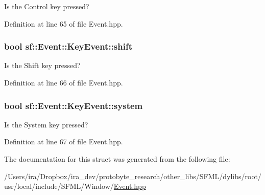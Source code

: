 Is the Control key pressed? 



Definition at line 65 of file Event.\-hpp.

\hypertarget{structsf_1_1_event_1_1_key_event_a776af1a3ca79abeeec18ebf1c0065aa9}{
\subsubsection[{shift}]{\setlength{\rightskip}{0pt plus 5cm}bool sf\-::\-Event\-::\-Key\-Event\-::shift}}\label{structsf_1_1_event_1_1_key_event_a776af1a3ca79abeeec18ebf1c0065aa9}


Is the Shift key pressed? 



Definition at line 66 of file Event.\-hpp.

\hypertarget{structsf_1_1_event_1_1_key_event_ac0557f7edc2a608ec65175fdd843afc5}{
\subsubsection[{system}]{\setlength{\rightskip}{0pt plus 5cm}bool sf\-::\-Event\-::\-Key\-Event\-::system}}\label{structsf_1_1_event_1_1_key_event_ac0557f7edc2a608ec65175fdd843afc5}


Is the System key pressed? 



Definition at line 67 of file Event.\-hpp.



The documentation for this struct was generated from the following file\-:\begin{DoxyCompactItemize}
\item 
/\-Users/ira/\-Dropbox/ira\-\_\-dev/protobyte\-\_\-research/other\-\_\-libs/\-S\-F\-M\-L/dylibs/root/usr/local/include/\-S\-F\-M\-L/\-Window/\hyperlink{_event_8hpp}{Event.\-hpp}\end{DoxyCompactItemize}
